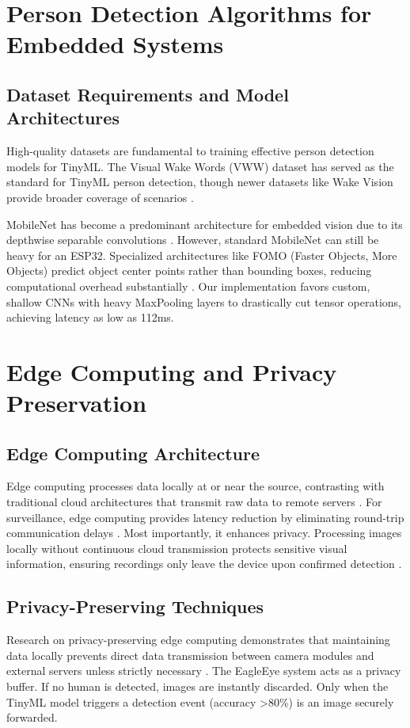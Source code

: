 \documentclass[12pt, a4paper]{article}
\begin{document}
\section{Person Detection Algorithms for Embedded Systems}

\subsection{Dataset Requirements and Model Architectures}
High-quality datasets are fundamental to training effective person detection models for TinyML. The Visual Wake Words (VWW) dataset has served as the standard for TinyML person detection, though newer datasets like Wake Vision provide broader coverage of scenarios \cite{ref26, ref27}.

MobileNet has become a predominant architecture for embedded vision due to its depthwise separable convolutions \cite{ref28, ref29, ref30}. However, standard MobileNet can still be heavy for an ESP32. Specialized architectures like FOMO (Faster Objects, More Objects) predict object center points rather than bounding boxes, reducing computational overhead substantially \cite{ref23, ref24}. Our implementation favors custom, shallow CNNs with heavy MaxPooling layers to drastically cut tensor operations, achieving latency as low as 112ms.

\section{Edge Computing and Privacy Preservation}

\subsection{Edge Computing Architecture}
Edge computing processes data locally at or near the source, contrasting with traditional cloud architectures that transmit raw data to remote servers \cite{ref2, ref33, ref34}. For surveillance, edge computing provides latency reduction by eliminating round-trip communication delays \cite{ref2}. Most importantly, it enhances privacy. Processing images locally without continuous cloud transmission protects sensitive visual information, ensuring recordings only leave the device upon confirmed detection \cite{ref33, ref34, ref35}.

\subsection{Privacy-Preserving Techniques}
Research on privacy-preserving edge computing demonstrates that maintaining data locally prevents direct data transmission between camera modules and external servers unless strictly necessary \cite{ref36}. The EagleEye system acts as a privacy buffer. If no human is detected, images are instantly discarded. Only when the TinyML model triggers a detection event (accuracy >80\%) is an image securely forwarded.
\end{document}
